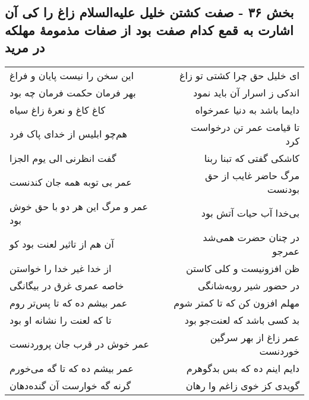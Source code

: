 \begin{center}
\section*{بخش ۳۶ - صفت کشتن خلیل علیه‌السلام زاغ را کی آن اشارت به قمع کدام صفت بود از صفات مذمومهٔ مهلکه در مرید}
\label{sec:sh036}
\begin{longtable}{l p{0.5cm} r}
این سخن را نیست پایان و فراغ
&&
ای خلیل حق چرا کشتی تو زاغ
\\
بهر فرمان حکمت فرمان چه بود
&&
اندکی ز اسرار آن باید نمود
\\
کاغ کاغ و نعرهٔ زاغ سیاه
&&
دایما باشد به دنیا عمرخواه
\\
هم‌چو ابلیس از خدای پاک فرد
&&
تا قیامت عمر تن درخواست کرد
\\
گفت انظرنی الی یوم الجزا
&&
کاشکی گفتی که تبنا ربنا
\\
عمر بی توبه همه جان کندنست
&&
مرگ حاضر غایب از حق بودنست
\\
عمر و مرگ این هر دو با حق خوش بود
&&
بی‌خدا آب حیات آتش بود
\\
آن هم از تاثیر لعنت بود کو
&&
در چنان حضرت همی‌شد عمرجو
\\
از خدا غیر خدا را خواستن
&&
ظن افزونیست و کلی کاستن
\\
خاصه عمری غرق در بیگانگی
&&
در حضور شیر روبه‌شانگی
\\
عمر بیشم ده که تا پس‌تر روم
&&
مهلم افزون کن که تا کمتر شوم
\\
تا که لعنت را نشانه او بود
&&
بد کسی باشد که لعنت‌جو بود
\\
عمر خوش در قرب جان پروردنست
&&
عمر زاغ از بهر سرگین خوردنست
\\
عمر بیشم ده که تا گه می‌خورم
&&
دایم اینم ده که بس بدگوهرم
\\
گرنه گه خوارست آن گنده‌دهان
&&
گویدی کز خوی زاغم وا رهان
\\
\end{longtable}
\end{center}
